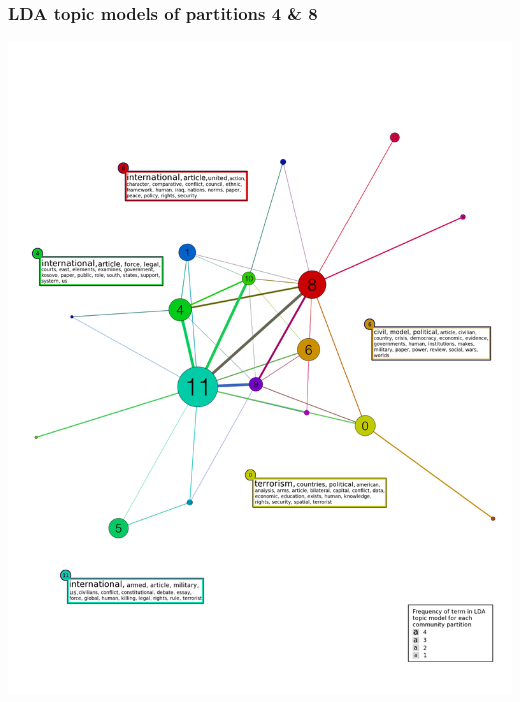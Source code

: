 \documentclass[xcolor=dvipsnames, 9pt]{beamer}
\begin{document}
\begin{frame}[fragile]
    \frametitle{LDA topic models of partitions 4 \& 8}
        \includegraphics[width=15cm,clip,trim=1cm 4cm 2.5cm 3cm]{../images/articles_spinglass_topic_viz.pdf}
\end{frame}
\end{document}

